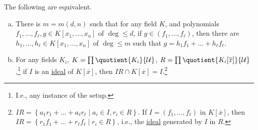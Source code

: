 \begin{theorem}\label{thm:lec25}
	The following are equivalent.
	\begin{enumerate}[(a)]
		\item\label{thm:lec25-a} There is \(m = m(d, n)\) such that for any field \(K\), and polynomials \(f_1, \dots , f_{\ell }, g\in K[x_1, \dots , x_n]\) of \(\deg \leq d\), if \(g\in (f_1, \dots , f_{\ell } )\), then there are \(h_1, \dots , h_{\ell } \in K[x_1, \dots , x_n]\) of \(\deg \leq m\) such that \(g = h_1 f_1 + \dots + h_{\ell } f_{\ell } \).
		\item\label{thm:lec25-b} For any fields \(K_i\), \(K = \prod \quotient{K_i}{\mathcal{U} } \), \(R = \prod \quotient{K_i[\overline{x} ]}{\mathcal{U} } \),\footnote{I.e., any instance of the setup.} if \(I\) is an \hyperref[def:ideal]{ideal} of \(K[\overline{x} ]\), then \(IR \cap K[\overline{x} ] = I\).\footnote{\(IR = \left\{ a_1 r_1 + \dots + a_{\ell }  r_{\ell }  \mid a_i \in I, r_i \in R \right\} \). If \(I = (f_1, \dots , f_{\ell } )\) in \(K[\overline{x} ]\), then \(IR = \left\{ r_1 f_1 + \dots + r_{\ell }  f_{\ell }  \mid r_i\in R\right\} \), i.e., the \hyperref[def:ideal]{ideal} generated by \(I\) in \(R\).}
	\end{enumerate}
\end{theorem}
